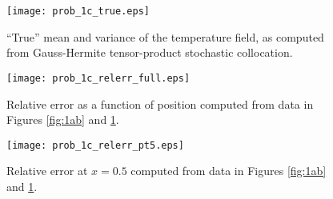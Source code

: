 \documentclass[11pt]{article}
\begin{document}
\begin{figure}[p]
\centering
\texttt{[image: prob\_1c\_true.eps]}
\caption{``True'' mean and variance of the temperature field, as computed from Gauss-Hermite tensor-product stochastic collocation.}
\label{fig:1c_true}
\end{figure}

\begin{figure}[p]
\centering
\texttt{[image: prob\_1c\_relerr\_full.eps]}
\caption{Relative error as a function of position computed from data in Figures \ref{fig:1ab} and \ref{fig:1c_true}.}
\label{fig:1c_relerr_full}
\end{figure}

\begin{figure}[p]
\centering
\texttt{[image: prob\_1c\_relerr\_pt5.eps]}
\\[1em]
\caption{Relative error at $x=0.5$ computed from data in Figures \ref{fig:1ab} and \ref{fig:1c_true}.}
\label{fig:1c_relerr_pt5}
\end{figure}


\end{document}
